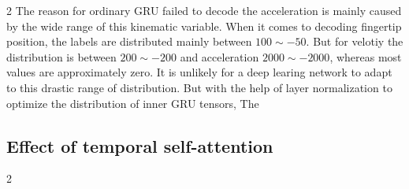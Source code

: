 \begin{multicols}{2}
The reason for ordinary GRU failed to decode the acceleration is mainly caused by the wide range of this kinematic variable.
When it comes to decoding fingertip position, the labels are distributed mainly between $100\sim-50$.
But for velotiy the distribution is between $200\sim-200$ and acceleration $2000\sim-2000$, whereas most values are approximately zero.
It is unlikely for a deep learing network to adapt to this drastic range of distribution.
But with the help of layer normalization to optimize the distribution of inner GRU tensors,
The

\end{multicols}

\subsection{Effect of temporal self-attention}
\begin{multicols}{2}
\end{multicols}

